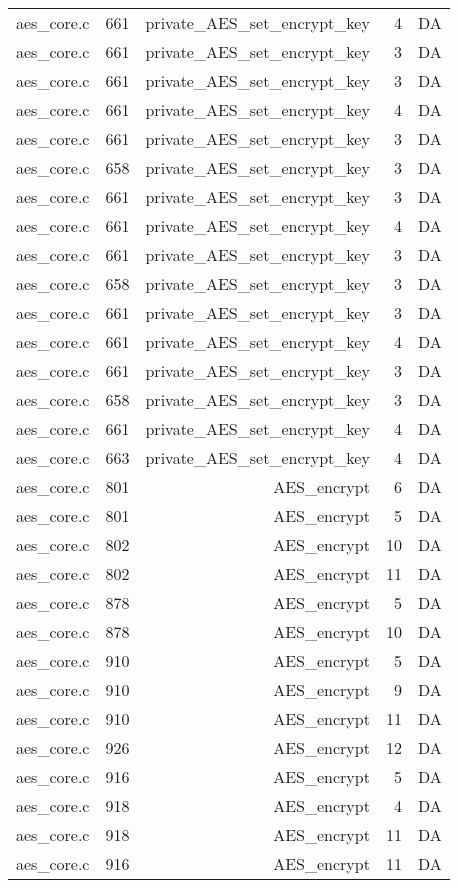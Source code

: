 \begin{table}[h]
{\begin{tabular}{clrrr}
aes\_core.c&661&private\_AES\_set\_encrypt\_key&4 &DA\\
aes\_core.c&661&private\_AES\_set\_encrypt\_key&3 &DA\\
aes\_core.c&661&private\_AES\_set\_encrypt\_key&3 &DA\\
aes\_core.c&661&private\_AES\_set\_encrypt\_key&4 &DA\\
aes\_core.c&661&private\_AES\_set\_encrypt\_key&3 &DA\\
aes\_core.c&658&private\_AES\_set\_encrypt\_key&3 &DA\\
aes\_core.c&661&private\_AES\_set\_encrypt\_key&3 &DA\\
aes\_core.c&661&private\_AES\_set\_encrypt\_key&4 &DA\\
aes\_core.c&661&private\_AES\_set\_encrypt\_key&3 &DA\\
aes\_core.c&658&private\_AES\_set\_encrypt\_key&3 &DA\\
aes\_core.c&661&private\_AES\_set\_encrypt\_key&3 &DA\\
aes\_core.c&661&private\_AES\_set\_encrypt\_key&4 &DA\\
aes\_core.c&661&private\_AES\_set\_encrypt\_key&3 &DA\\
aes\_core.c&658&private\_AES\_set\_encrypt\_key&3 &DA\\
aes\_core.c&661&private\_AES\_set\_encrypt\_key&4 &DA\\
aes\_core.c&663&private\_AES\_set\_encrypt\_key&4 &DA\\
aes\_core.c&801&AES\_encrypt&6 &DA\\
aes\_core.c&801&AES\_encrypt&5 &DA\\
aes\_core.c&802&AES\_encrypt&10&DA\\
aes\_core.c&802&AES\_encrypt&11&DA\\
aes\_core.c&878&AES\_encrypt&5 &DA\\
aes\_core.c&878&AES\_encrypt&10&DA\\
aes\_core.c&910&AES\_encrypt&5 &DA\\
aes\_core.c&910&AES\_encrypt&9 &DA\\
aes\_core.c&910&AES\_encrypt&11&DA\\
aes\_core.c&926&AES\_encrypt&12&DA\\
aes\_core.c&916&AES\_encrypt&5 &DA\\
aes\_core.c&918&AES\_encrypt&4 &DA\\
aes\_core.c&918&AES\_encrypt&11&DA\\
aes\_core.c&916&AES\_encrypt&11&DA\\

\end{tabular}}
\end{table}
